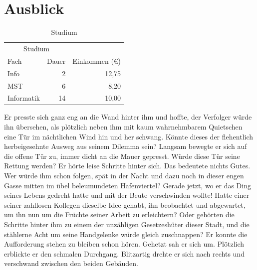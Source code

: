 \section{Ausblick}
\label{Kapitel_3_-_Unterkapitel_2}
%
\begin{table}[b]
\centering
\begin{tabular}{lrr}
\toprule
\multicolumn{2}{c}{Studium}\\ \cmidrule{1-2}
Fach & Dauer & Einkommen (\euro{})\\
\midrule
Info & 2 & 12,75 \\ \addlinespace
MST & 6 & 8,20 \\ \addlinespace
Informatik & 14 & 10,00\\
\bottomrule
\end{tabular}
\caption{Studium}
\label{table:Studium}
\end{table}
%
Er presste sich ganz eng an die Wand hinter ihm und hoffte, der
Verfolger würde ihn übersehen, als plötzlich neben ihm mit kaum
wahrnehmbarem Quietschen eine Tür im nächtlichen Wind hin und her
schwang. Könnte dieses der flehentlich herbeigesehnte Ausweg aus
seinem Dilemma sein? Langsam bewegte er sich auf die offene Tür
zu, immer dicht an die Mauer gepresst. Würde diese Tür seine
Rettung werden? Er hörte leise Schritte hinter sich. Das bedeutete
nichts Gutes. Wer würde ihm schon folgen, spät in der Nacht und
dazu noch in dieser engen Gasse mitten im übel beleumundeten
Hafenviertel? Gerade jetzt, wo er das Ding seines Lebens gedreht
hatte und mit der Beute verschwinden wollte! Hatte einer seiner
zahllosen Kollegen dieselbe Idee gehabt, ihn beobachtet und
abgewartet, um ihn nun um die Früchte seiner Arbeit zu
erleichtern? Oder gehörten die Schritte hinter ihm zu einem der
unzähligen Gesetzeshüter dieser Stadt, und die stählerne Acht um
seine Handgelenke würde gleich zuschnappen? Er konnte die
Aufforderung stehen zu bleiben schon hören. Gehetzt sah er sich
um. Plötzlich erblickte er den schmalen Durchgang. Blitzartig
drehte er sich nach rechts und verschwand zwischen den beiden
Gebäuden.

